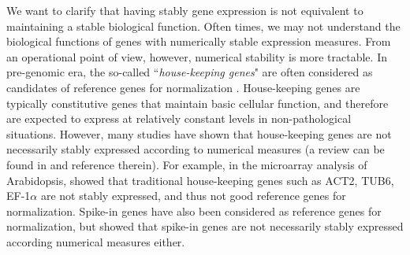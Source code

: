 \documentclass[letterpaper,12pt]{article}
\begin{document}
We want to clarify that having stably gene expression is not
equivalent to maintaining a stable biological function.
Often times, we may not
understand the biological functions of genes with numerically stable
expression measures. From an operational point of view, however, numerical
stability is more tractable. In pre-genomic era, the so-called ``\textit{house-keeping
genes}" are often considered as candidates of reference genes for
normalization \citep{bustin2002quantification, andersen2004normalization}. House-keeping
genes are typically constitutive genes that
maintain basic cellular function, and therefore are expected to express at
relatively constant levels in non-pathological situations.  However, many
studies have shown that house-keeping
genes are not necessarily stably expressed according to
numerical measures (a review can be found in \cite{huggett2005real} and
reference therein).  For example, in the microarray analysis of Arabidopsis, \cite{czechowski2005genome}
showed that traditional house-keeping
genes such as ACT2, TUB6, EF-1$\alpha$ are not stably
expressed, and thus not good reference genes for normalization.  Spike-in
genes  have also been considered as reference genes for normalization, but %
\cite{risso2014nat} showed that spike-in genes are not necessarily stably
expressed according numerical measures either.  
\end{document}
